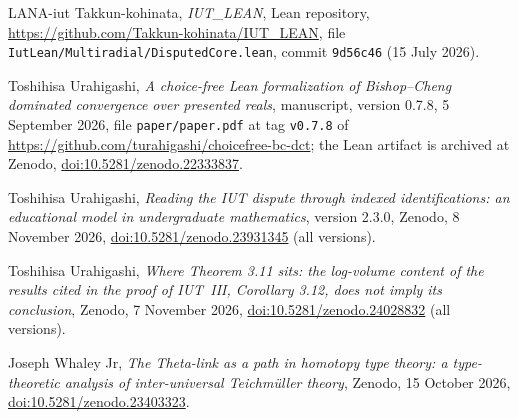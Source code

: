 \documentclass[11pt,a4paper]{article}
\theoremstyle{plain}
\theoremstyle{definition}
\theoremstyle{remark}
\begin{document}
\begin{thebibliography}{LANA-iut}
Takkun-kohinata, \emph{IUT\_LEAN}, Lean repository, \url{https://github.com/Takkun-kohinata/IUT_LEAN}, file
\texttt{IutLean/Multiradial/DisputedCore.lean}, commit \texttt{9d56c46} (15 July 2026).

Toshihisa Urahigashi, \emph{A choice-free {L}ean formalization of {B}ishop--{C}heng dominated convergence over presented
reals}, manuscript, version 0.7.8, 5 September 2026, file \texttt{paper/paper.pdf} at tag \texttt{v0.7.8} of
\url{https://github.com/turahigashi/choicefree-bc-dct}; the Lean artifact is archived at Zenodo,
\href{https://doi.org/10.5281/zenodo.22333837}{doi:10.5281/zenodo.22333837}.

Toshihisa Urahigashi, \emph{Reading the {IUT} dispute through indexed identifications: an educational model in
undergraduate mathematics}, version 2.3.0, Zenodo, 8 November 2026,
\href{https://doi.org/10.5281/zenodo.23931345}{doi:10.5281/zenodo.23931345} (all versions).

Toshihisa Urahigashi, \emph{Where {T}heorem 3.11 sits: the log-volume content of the results cited in the proof of
{IUT}~{III}, {C}orollary 3.12, does not imply its conclusion}, Zenodo, 7 November 2026,
\href{https://doi.org/10.5281/zenodo.24028832}{doi:10.5281/zenodo.24028832} (all versions).

Joseph Whaley Jr, \emph{The {T}heta-link as a path in homotopy type theory: a type-theoretic analysis of
inter-universal {T}eichm\"uller theory}, Zenodo, 15 October 2026,
\href{https://doi.org/10.5281/zenodo.23403323}{doi:10.5281/zenodo.23403323}.
\end{thebibliography}
\end{document}
